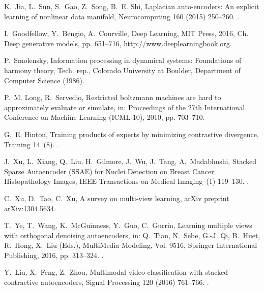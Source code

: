 \documentclass[preprint,5p,compress]{elsarticle}
\begin{document}
\begin{thebibliography}{100}
K.~Jia, L.~Sun, S.~Gao, Z.~Song, B.~E. Shi, Laplacian auto-encoders: An
  explicit learning of nonlinear data manifold, Neurocomputing 160 (2015)
  250--260.
\newblock \href {http://dx.doi.org/10.1016/j.neucom.2015.02.023}
  {}.

I.~Goodfellow, Y.~Bengio, A.~Courville, Deep Learning, MIT Press, 2016, Ch.
  Deep generative models, pp. 651--716, \url{http://www.deeplearningbook.org}.

P.~Smolensky, Information processing in dynamical systems: Foundations of
  harmony theory, Tech. rep., Colorado University at Boulder, Department of
  Computer Science (1986).

P.~M. Long, R.~Servedio, Restricted boltzmann machines are hard to
  approximately evaluate or simulate, in: Proceedings of the 27th International
  Conference on Machine Learning (ICML-10), 2010, pp. 703--710.

G.~E. Hinton, Training products of experts by minimizing contrastive
  divergence, Training 14~(8).
\newblock \href {http://dx.doi.org/10.1162/089976602760128018}
  {}.

J.~Xu, L.~Xiang, Q.~Liu, H.~Gilmore, J.~Wu, J.~Tang, A.~Madabhushi, {Stacked
  Sparse Autoencoder (SSAE) for Nuclei Detection on Breast Cancer
  Histopathology Images}, IEEE Transactions on Medical Imaging~(1)  119--130.
\newblock \href {http://dx.doi.org/10.1109/TMI.2015.2458702}
  {}.

C.~Xu, D.~Tao, C.~Xu, A survey on multi-view learning, arXiv preprint
  arXiv:1304.5634.

T.~Ye, T.~Wang, K.~{McGuinness}, Y.~Guo, C.~Gurrin, Learning multiple views
  with orthogonal denoising autoencoders, in: Q.~Tian, N.~Sebe, G.-J. Qi,
  B.~Huet, R.~Hong, X.~Liu (Eds.), {MultiMedia} Modeling, Vol. 9516, Springer
  International Publishing, 2016, pp. 313--324.
\newblock \href {http://dx.doi.org/10.1007/978-3-319-27671-7\_26}
  {}.

Y.~Liu, X.~Feng, Z.~Zhou, Multimodal video classification with stacked
  contractive autoencoders, Signal Processing 120 (2016) 761--766.
\newblock \href {http://dx.doi.org/10.1016/j.sigpro.2015.01.001}
  {}.


\end{thebibliography}
\end{document}
